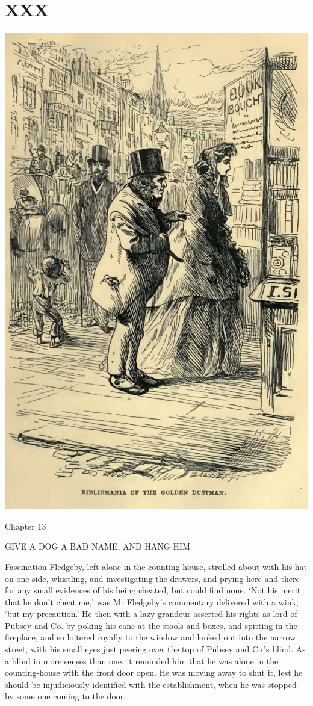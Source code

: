
\chapter{XXX}

\includegraphics[scale=2.3]{03-05-01}

Chapter 13

GIVE A DOG A BAD NAME, AND HANG HIM


Fascination Fledgeby, left alone in the counting-house, strolled about
with his hat on one side, whistling, and investigating the drawers, and
prying here and there for any small evidences of his being cheated,
but could find none. ‘Not his merit that he don’t cheat me,’ was Mr
Fledgeby’s commentary delivered with a wink, ‘but my precaution.’ He
then with a lazy grandeur asserted his rights as lord of Pubsey and
Co. by poking his cane at the stools and boxes, and spitting in the
fireplace, and so loitered royally to the window and looked out into the
narrow street, with his small eyes just peering over the top of Pubsey
and Co.’s blind. As a blind in more senses than one, it reminded him
that he was alone in the counting-house with the front door open. He was
moving away to shut it, lest he should be injudiciously identified with
the establishment, when he was stopped by some one coming to the door.

